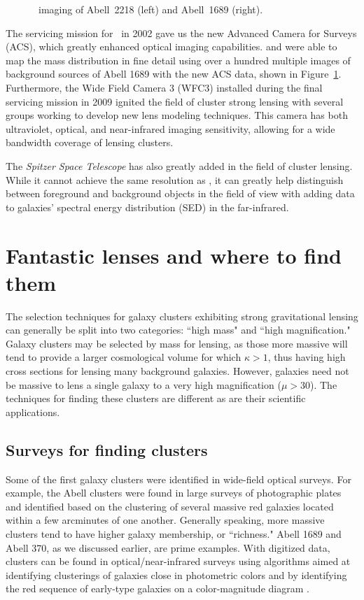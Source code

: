 \begin{figure}
\caption[Abell 2218 and Abell 1689]{\hst\ imaging of Abell~2218 (left) and Abell~1689 (right).}
\label{intro:fig:lensing_clusters}
\end{figure}

The servicing mission for \hst\ in 2002 gave us the new Advanced Camera for Surveys (ACS), which greatly enhanced optical imaging capabilities. \citet{Broadhurst:2005qy} and \citet{Halkola:2006ss} were able to map the mass distribution in fine detail using over a hundred multiple images of background sources of Abell 1689 with the new ACS data, shown in Figure~\ref{intro:fig:lensing_clusters}. Furthermore, the Wide Field Camera 3 (WFC3) installed during the final servicing mission in 2009 ignited the field of cluster strong lensing with several groups working to develop new lens modeling techniques. This camera has both ultraviolet, optical, and near-infrared imaging sensitivity, allowing for a wide bandwidth coverage of lensing clusters.

The {\it Spitzer Space Telescope} has also greatly added in the field of cluster lensing. While it cannot achieve the same resolution as \hst, it can greatly help distinguish between foreground and background objects in the field of view with adding data to galaxies' spectral energy distribution (SED) in the far-infrared.

\section{Fantastic lenses and where to find them}

The selection techniques for galaxy clusters exhibiting strong gravitational lensing can generally be split into two categories: ``high mass" and ``high magnification." Galaxy clusters may be selected by mass for lensing, as those more massive will tend to provide a larger cosmological volume for which $\kappa>1$, thus having high cross sections for lensing many background galaxies. However, galaxies need not be massive to lens a single galaxy to a very high magnification ($\mu>30$). The techniques for finding these clusters are different as are their scientific applications.

\subsection{Surveys for finding clusters}

Some of the first galaxy clusters were identified in wide-field optical surveys. For example, the Abell clusters \citep{Abell:1958mz,Zwicky:1968rm,Abell:1989ly} were found in large surveys of photographic plates and identified based on the clustering of several massive red galaxies located within a few arcminutes of one another. Generally speaking, more massive clusters tend to have higher galaxy membership, or ``richness." Abell 1689 and Abell 370, as we discussed earlier, are prime examples. With digitized data, clusters can be found in optical/near-infrared surveys using algorithms aimed at identifying clusterings of galaxies close in photometric colors and by identifying the red sequence of early-type galaxies on a color-magnitude diagram \citep{Rykoff:2014rz,Gladders:2000kq}.

